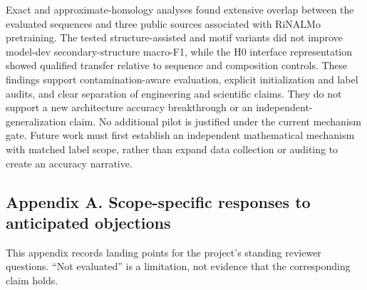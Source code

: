 \documentclass[
  11pt]{article}
\begin{document}
Exact and approximate-homology analyses found extensive overlap between
the evaluated sequences and three public sources associated with RiNALMo
pretraining. The tested structure-assisted and motif variants did not
improve model-dev secondary-structure macro-F1, while the H0 interface
representation showed qualified transfer relative to sequence and
composition controls. These findings support contamination-aware
evaluation, explicit initialization and label audits, and clear
separation of engineering and scientific claims. They do not support a
new architecture accuracy breakthrough or an independent-generalization
claim. No additional pilot is justified under the current mechanism
gate. Future work must first establish an independent mathematical
mechanism with matched label scope, rather than expand data collection
or auditing to create an accuracy narrative.

\hypertarget{appendix-a-scope-specific-responses-to-anticipated-objections}{%
\subsection{Appendix A. Scope-specific responses to anticipated
objections}\label{appendix-a-scope-specific-responses-to-anticipated-objections}}

This appendix records landing points for the project's standing reviewer
questions. ``Not evaluated'' is a limitation, not evidence that the
corresponding claim holds.
\end{document}
